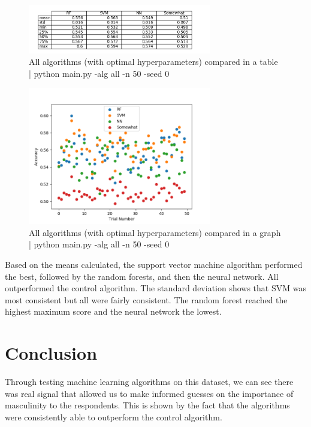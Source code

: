 \documentclass{article}
\begin{document}
\begin{figure}
\begin{center}
\includegraphics[width=8cm]{images/all_alg_table}
\caption{All algorithms (with optimal hyperparameters) compared in a table | python main.py -alg all -n 50 -seed 0}
\end{center}
\end{figure}
\begin{figure}
\begin{center}
\includegraphics[width=8cm]{images/all_alg_graph}
\caption{All algorithms (with optimal hyperparameters) compared in a graph | python main.py -alg all -n 50 -seed 0}
\end{center}
\end{figure}

Based on the means calculated, the support vector machine algorithm performed the best, followed by the random forests, and then the neural network. All outperformed the control algorithm. The standard deviation shows that SVM was most consistent but all were fairly consistent. The random forest reached the highest maximum score and the neural network the lowest.

\section{Conclusion}

Through testing machine learning algorithms on this dataset, we can see there was real signal that allowed us to make informed guesses on the importance of masculinity to the respondents. This is shown by the fact that the algorithms were consistently able to outperform the control algorithm. \\
\end{document}
